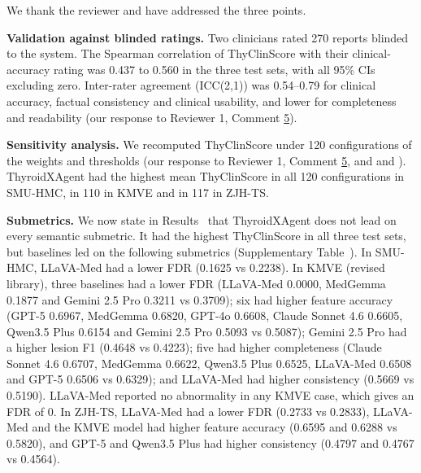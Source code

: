 We thank the reviewer and have addressed the three points.\par

\textbf{Validation against blinded ratings.} Two clinicians rated 270 reports blinded to the system. The Spearman correlation of ThyClinScore with their clinical-accuracy rating was 0.437 to 0.560 in the three test sets, with all 95\% CIs excluding zero. Inter-rater agreement (ICC(2,1)) was 0.54--0.79 for clinical accuracy, factual consistency and clinical usability, and lower for completeness and readability (our response to Reviewer 1, Comment \hyperref[rev:R1.5]{5}).\par

\textbf{Sensitivity analysis.} We recomputed ThyClinScore under 120 configurations of the weights and thresholds (our response to Reviewer 1, Comment \hyperref[rev:R1.5]{5}, and  and ). ThyroidXAgent had the highest mean ThyClinScore in all 120 configurations in SMU-HMC, in 110 in KMVE and in 117 in ZJH-TS.\par

\textbf{Submetrics.} We now state in Results~\SecResReport{} that ThyroidXAgent does not lead on every semantic submetric. It had the highest ThyClinScore in all three test sets, but baselines led on the following submetrics (Supplementary Table~\SuppTabClinical{}). In SMU-HMC, LLaVA-Med had a lower FDR (0.1625 vs 0.2238). In KMVE (revised library), three baselines had a lower FDR (LLaVA-Med 0.0000, MedGemma 0.1877 and Gemini 2.5 Pro 0.3211 vs 0.3709); six had higher feature accuracy (GPT-5 0.6967, MedGemma 0.6820, GPT-4o 0.6608, Claude Sonnet 4.6 0.6605, Qwen3.5 Plus 0.6154 and Gemini 2.5 Pro 0.5093 vs 0.5087); Gemini 2.5 Pro had a higher lesion F1 (0.4648 vs 0.4223); five had higher completeness (Claude Sonnet 4.6 0.6707, MedGemma 0.6622, Qwen3.5 Plus 0.6525, LLaVA-Med 0.6508 and GPT-5 0.6506 vs 0.6329); and LLaVA-Med had higher consistency (0.5669 vs 0.5190). LLaVA-Med reported no abnormality in any KMVE case, which gives an FDR of 0. In ZJH-TS, LLaVA-Med had a lower FDR (0.2733 vs 0.2833), LLaVA-Med and the KMVE model had higher feature accuracy (0.6595 and 0.6288 vs 0.5820), and GPT-5 and Qwen3.5 Plus had higher consistency (0.4797 and 0.4767 vs 0.4564).\par
